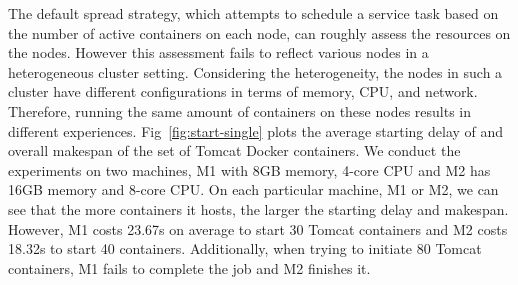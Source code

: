 The default spread strategy, which 
attempts to schedule a service task based on the number of active containers on each node, 
can roughly assess the resources on the nodes. 
However this assessment fails to reflect various nodes in a heterogeneous cluster setting.
Considering the heterogeneity, the nodes in such a cluster have different configurations in terms of memory, CPU, and network.
Therefore, running the same amount of containers on these nodes results in different experiences.
Fig~\ref{fig:start-single} plots the average starting delay of and overall makespan of the set of Tomcat Docker containers. 
We conduct the experiments on two machines, M1 with 8GB memory, 4-core CPU and M2 has
16GB memory and 8-core CPU. On each particular machine, M1 or M2, we can see that the more containers it hosts, the larger the starting delay 
and makespan. However, M1 costs 23.67s on average to start 30 Tomcat containers and M2 costs 18.32s to start 40 containers. 
Additionally, when trying to initiate 80 Tomcat containers, M1 fails to complete the job and M2 finishes it.




